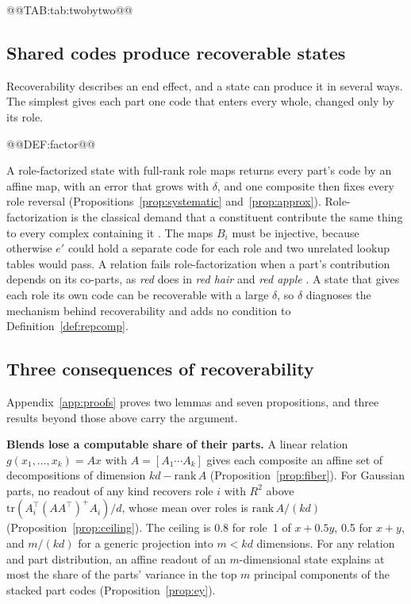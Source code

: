 @@TAB:tab:twobytwo@@

\subsection{Shared codes produce recoverable states}
\label{sec:mechanics}

Recoverability describes an end effect, and a state can produce it in several ways. The simplest gives each part one code that enters every whole, changed only by its role.

@@DEF:factor@@

A role-factorized state with full-rank role maps returns every part's code by an affine map, with an error that grows with $\delta$, and one composite then fixes every role reversal (Propositions~\ref{prop:systematic} and~\ref{prop:approx}). Role-factorization is the classical demand that a constituent contribute the same thing to every complex containing it \citep{fodor1988}. The maps $B_i$ must be injective, because otherwise $e'$ could hold a separate code for each role and two unrelated lookup tables would pass. A relation fails role-factorization when a part's contribution depends on its co-parts, as \emph{red} does in \emph{red hair} and \emph{red apple} \citep{kamp1995}. A state that gives each role its own code can be recoverable with a large $\delta$, so $\delta$ diagnoses the mechanism behind recoverability and adds no condition to Definition~\ref{def:repcomp}.

\subsection{Three consequences of recoverability}
\label{sec:consequences}

Appendix~\ref{app:proofs} proves two lemmas and seven propositions, and three results beyond those above carry the argument.

\textbf{Blends lose a computable share of their parts.} A linear relation $g(x_1, \ldots, x_k) = A x$ with $A = [A_1 \cdots A_k]$ gives each composite an affine set of decompositions of dimension $kd - \mathrm{rank}\,A$ (Proposition~\ref{prop:fiber}). For Gaussian parts, no readout of any kind recovers role $i$ with $R^2$ above $\mathrm{tr}(A_i^{\top}(AA^{\top})^{+}A_i)/d$, whose mean over roles is $\mathrm{rank}\,A/(kd)$ (Proposition~\ref{prop:ceiling}). The ceiling is 0.8 for role~1 of $x + 0.5y$, 0.5 for $x + y$, and $m/(kd)$ for a generic projection into $m < kd$ dimensions. For any relation and part distribution, an affine readout of an $m$-dimensional state explains at most the share of the parts' variance in the top $m$ principal components of the stacked part codes (Proposition~\ref{prop:ey}).

